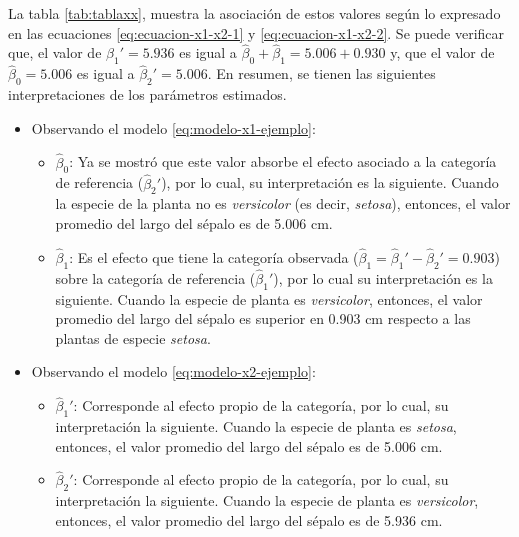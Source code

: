 \documentclass[
  11pt,
]{book}
\providecommand{\tightlist}{%
  \setlength{\itemsep}{0pt}\setlength{\parskip}{0pt}}
\theoremstyle{definition}
\theoremstyle{definition}
\theoremstyle{definition}
\theoremstyle{definition}
\theoremstyle{remark}
\begin{document}
La tabla \ref{tab:tablaxx}, muestra la asociación de estos valores según lo expresado en las ecuaciones \eqref{eq:ecuacion-x1-x2-1} y \eqref{eq:ecuacion-x1-x2-2}. Se puede verificar que, el valor de \(\widehat{\beta}_1' = 5.936\) es igual a \(\widehat{\beta}_0 + \widehat{\beta}_1 = 5.006 + 0.930\) y, que el valor de \(\widehat{\beta}_0 = 5.006\) es igual a \(\widehat{\beta}_2' = 5.006\). En resumen, se tienen las siguientes interpretaciones de los parámetros estimados.

\begin{itemize}
\tightlist
\item
  Observando el modelo \eqref{eq:modelo-x1-ejemplo}:

  \begin{itemize}
  \tightlist
  \item
    \(\widehat{\beta}_0\): Ya se mostró que este valor absorbe el efecto asociado a la categoría de referencia (\(\widehat{\beta}_2'\)), por lo cual, su interpretación es la siguiente. Cuando la especie de la planta no es \emph{versicolor} (es decir, \emph{setosa}), entonces, el valor promedio del largo del sépalo es de 5.006 cm.
  \item
    \(\widehat{\beta}_1\): Es el efecto que tiene la categoría observada (\(\widehat{\beta}_1 = \widehat{\beta}_1' - \widehat{\beta}_2' = 0.903\)) sobre la categoría de referencia (\(\widehat{\beta}_1'\)), por lo cual su interpretación es la siguiente. Cuando la especie de planta es \emph{versicolor}, entonces, el valor promedio del largo del sépalo es superior en 0.903 cm respecto a las plantas de especie \emph{setosa}.
  \end{itemize}
\item
  Observando el modelo \eqref{eq:modelo-x2-ejemplo}:

  \begin{itemize}
  \tightlist
  \item
    \(\widehat{\beta}_1'\): Corresponde al efecto propio de la categoría, por lo cual, su interpretación la siguiente. Cuando la especie de planta es \emph{setosa}, entonces, el valor promedio del largo del sépalo es de 5.006 cm.
  \item
    \(\widehat{\beta}_2'\): Corresponde al efecto propio de la categoría, por lo cual, su interpretación la siguiente. Cuando la especie de planta es \emph{versicolor}, entonces, el valor promedio del largo del sépalo es de 5.936 cm.
  \end{itemize}
\end{itemize}
\end{document}
